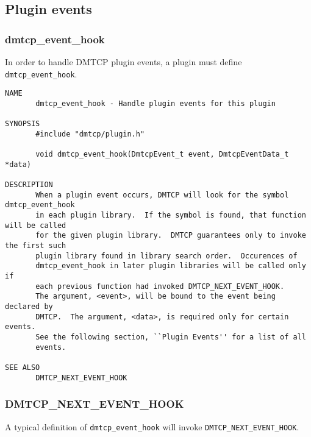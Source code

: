\documentclass{article}
\begin{document}
\subsection{Plugin events}

\subsubsection{dmtcp\_event\_hook}

In order to handle DMTCP plugin events, a plugin must
define {\tt dmtcp\_event\_hook}.

\begin{verbatim}
NAME
       dmtcp_event_hook - Handle plugin events for this plugin

SYNOPSIS
       #include "dmtcp/plugin.h"

       void dmtcp_event_hook(DmtcpEvent_t event, DmtcpEventData_t *data)

DESCRIPTION
       When a plugin event occurs, DMTCP will look for the symbol dmtcp_event_hook
       in each plugin library.  If the symbol is found, that function will be called
       for the given plugin library.  DMTCP guarantees only to invoke the first such
       plugin library found in library search order.  Occurences of
       dmtcp_event_hook in later plugin libraries will be called only if
       each previous function had invoked DMTCP_NEXT_EVENT_HOOK.
       The argument, <event>, will be bound to the event being declared by
       DMTCP.  The argument, <data>, is required only for certain events.
       See the following section, ``Plugin Events'' for a list of all
       events.

SEE ALSO
       DMTCP_NEXT_EVENT_HOOK
\end{verbatim}

\subsubsection{DMTCP\_NEXT\_EVENT\_HOOK}

A typical definition of {\tt dmtcp\_event\_hook} will invoke
{\tt DMTCP\_NEXT\_EVENT\_HOOK}.
\end{document}
